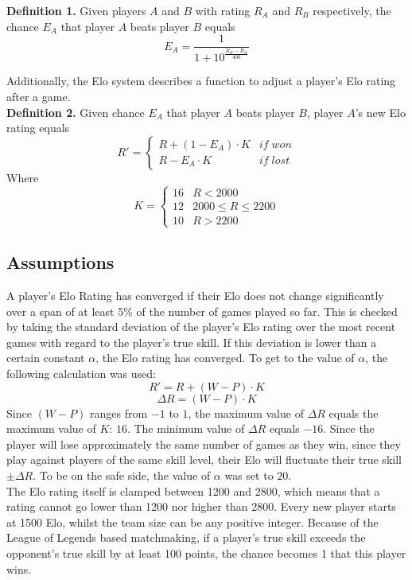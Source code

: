 \documentclass[12pt]{article}
\begin{document}
\textbf{Definition 1.} Given players $A$ and $B$ with rating $R_A$ and $R_B$ respectively, the chance $E_A$ that player $A$ beats player $B$ equals
\[ E_A = \frac{1}{1 + 10^{\frac{R_{B}-R_{A}}{400}}} \]

Additionally, the Elo system describes a function to adjust a player’s Elo rating after a game.\\

\textbf{Definition 2.} Given chance $E_A$ that player $A$ beats player $B$, player $A$'s new Elo rating equals
\[R' = \begin{cases}
R + (1 - E_A ) \cdot K & if \; won \\ R - E_A \cdot K & if \; lost
\end{cases}\]
Where
\[ K = \begin{cases}
16 & R < 2000 \\ 12 & 2000 \leq R \leq 2200 \\ 10 & R > 2200 
\end{cases}\]
\cite{wiki}

\subsection{Assumptions}
A player’s Elo Rating has converged if their Elo does not change significantly over a span of at least 5\% of the number of games played so far. This is checked by taking the standard deviation of the player's Elo rating over the most recent games with regard to the player’s true skill. If this deviation is lower than a certain constant $\alpha$, the Elo rating has converged. To get to the value of $\alpha$, the following calculation was used:
\[R' = R + (W - P) \cdot K\]
\[\Delta R = (W - P) \cdot K\]
Since $(W - P)$ ranges from $-1$ to $1$, the maximum value of $\Delta R$ equals the maximum value of $K$: $16$. The minimum value of $\Delta R$ equals $-16$. Since the player will lose approximately the same number of games as they win, since they play against players of the same skill level, their Elo will fluctuate their true skill $\pm \Delta R$. To be on the safe side, the value of $\alpha$ was set to $20$.\\
The Elo rating itself is clamped between 1200 and 2800, which means that a rating cannot go lower than 1200 nor higher than 2800. Every new player starts at 1500 Elo, whilst the team size can be any positive integer.
Because of the League of Legends based matchmaking, if a player's true skill exceeds the opponent's true skill by at least 100 points, the chance becomes 1 that this player wins.\\
\end{document}
